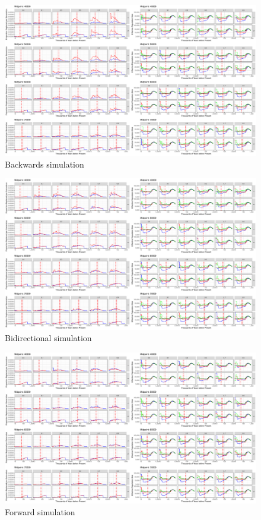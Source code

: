 \documentclass{article}
\begin{document}
\begin{figure}
	\centering
	\includegraphics[width=\textwidth]{plot/backward_different_starts.pdf}
	\caption{Backwards simulation}
	\label{fig:backsim}
\end{figure}


\begin{figure}
	\centering
	\includegraphics[width=\textwidth]{plot/bidirectional_different_starts.pdf}
	\caption{Bidirectional simulation}
	\label{fig:bisim}
\end{figure}

\begin{figure}
	\centering
	\includegraphics[width=\textwidth]{plot/forward_different_starts.pdf}
	\caption{Forward simulation}
	\label{fig:fwdsim}
\end{figure}
\end{document}

